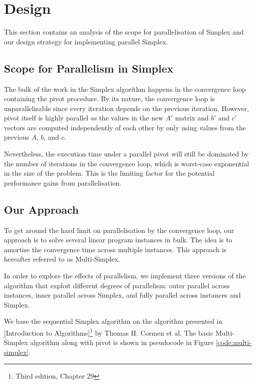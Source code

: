 \section{Design}
This section contains an analysis of the scope for parallelisation of Simplex and our design strategy for implementing parallel Simplex.

\subsection{Scope for Parallelism in Simplex}
The bulk of the work in the Simplex algorithm happens in the convergence loop containing the pivot procedure. By its nature, the convergence loop is unparallelisable since every iteration depends on the previous iteration. However, pivot itself is highly parallel as the values in the new $A'$ matrix and $b'$ and $c'$ vectors are computed independently of each other by only using values from the previous $A$, $b$, and $c$.

Nevertheless, the execution time under a parallel pivot will still be dominated by the number of iterations in the convergence loop, which is worst-case exponential in the size of the problem. This is the limiting factor for the potential performance gains from parallelisation.

\subsection{Our Approach}
To get around the hard limit on parallelisation by the convergence loop, our approach is to solve several linear program instances in bulk. The idea is to amortise the convergence time across multiple instances. This approach is hereafter referred to as Multi-Simplex.

In order to explore the effects of parallelism, we implement three versions of the algorithm that exploit different degrees of parallelism: outer parallel across instances, inner parallel across Simplex, and fully parallel across instances and Simplex.

We base the sequential Simplex algorithm on the algorithm presented in [Introduction to Algorithms]\footnote{Third edition, Chapter 29} by Thomas H. Cormen et al. The basic Multi-Simplex algorithm along with pivot is shown in pseudocode in Figure \ref{code:multi-simplex}.

